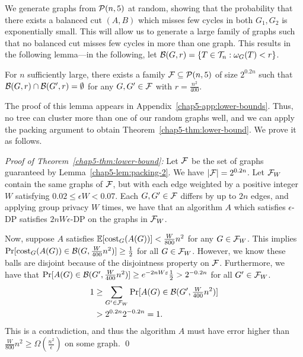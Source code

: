 We generate graphs from $\mathcal{P}(n, 5)$ at random, showing that the probability that there exists a balanced cut $(A,B)$ which misses few cycles in both $G_1, G_2$ is exponentially small. This will allow us to generate a large family of graphs such that no balanced cut misses few cycles in more than one graph. This results in the following lemma---in the following, let $\mathcal{B}(G, r) = \{T \in \mathcal{T}_n : \omega_G(T) < r\}$.
\begin{lem}\label{chap5-lem:packing-2}
    For $n$ sufficiently large, there exists a family $\mathcal{F} \subseteq \mathcal{P}(n,5)$ of size $2^{0.2n}$ such that $\mathcal{B}(G, r) \cap \mathcal{B}(G', r) = \emptyset$ for any $G,G' \in \mathcal{F}$ with $r = \frac{n^2}{400}$.
\end{lem}

The proof of this lemma appears in Appendix~\ref{chap5-app:lower-bounds}.
Thus, no tree can cluster more than one of our random graphs well, and we can apply the packing argument to obtain Theorem~\ref{chap5-thm:lower-bound}.
We prove it as follows.

\noindent \textit{Proof of Theorem~\ref{chap5-thm:lower-bound}:} 
Let $\mathcal{F}$ be the set of graphs guaranteed by Lemma~\ref{chap5-lem:packing-2}. We have $|\mathcal{F}| = 2^{0.2n}$. Let $\mathcal{F}_W$ contain the same graphs of $\mathcal{F}$, but with each edge weighted by a positive integer $W$ satisfying $0.02 \leq \epsilon W < 0.07$. Each $G,G' \in \mathcal{F}$ differs by up to $2n$ edges, and applying group privacy $W$ times, we have that an algorithm $A$ which satisfies $\epsilon$-DP satisfies $2n W \epsilon$-DP on the graphs in $\mathcal{F}_W$.

Now, suppose $A$ satisfies $\operatorname{\mathbb{E}}[\textnormal{cost}_G(A(G))] < \frac{W}{800} n^2$ for any $G \in \mathcal{F}_W$. This implies $\Pr[\textnormal{cost}_G(A(G)) \in \mathcal{B}(G, \frac{W}{400} n^2)] \geq \frac{1}{2}$ for all $G \in \mathcal{F}_W$. However, we know these balls are disjoint because of the disjointness property on $\mathcal{F}$. Furthermore, we have that $\Pr[A(G) \in \mathcal{B}(G', \frac{W}{400} n^2)] \geq e^{-2nW\varepsilon} \frac{1}{2} > 2^{-0.2n}$ for all $G' \in \mathcal{F}_W$.
\begin{align*}
    1 &\geq \sum_{G' \in \mathcal{F}_W} \Pr[A(G) \in \mathcal{B}(G', \tfrac{W}{400} n^2)] \\
    &> 2^{0.2 n} 2^{-0.2n} = 1.
\end{align*}
This is a contradiction, and thus the algorithm $A$ must have error higher than $\frac{W}{800}n^2 \geq \Omega(\frac{n^2}{\epsilon})$ on some graph. \qed